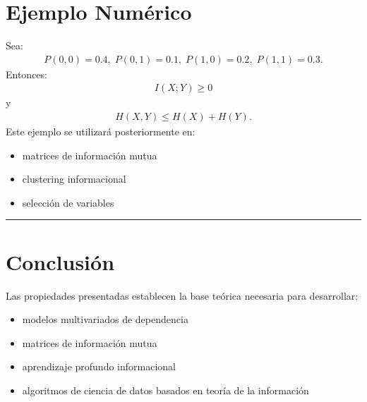 \documentclass[letterpaper,10pt,english]{jupyterBook}
\begin{document}
\section{Ejemplo Numérico}
\label{\detokenize{02_mathematical_foundations/properties_theorems:ejemplo-numerico}}
\sphinxAtStartPar
Sea:
\begin{equation*}
\begin{split}
P(0,0)=0.4,\;
P(0,1)=0.1,\;
P(1,0)=0.2,\;
P(1,1)=0.3.
\end{split}
\end{equation*}
\sphinxAtStartPar
Entonces:
\begin{equation*}
\begin{split}
I(X;Y)\ge 0
\end{split}
\end{equation*}
\sphinxAtStartPar
y
\begin{equation*}
\begin{split}
H(X,Y)\le H(X)+H(Y).
\end{split}
\end{equation*}
\sphinxAtStartPar
Este ejemplo se utilizará posteriormente en:
\begin{itemize}
\item {} 
\sphinxAtStartPar
matrices de información mutua

\item {} 
\sphinxAtStartPar
clustering informacional

\item {} 
\sphinxAtStartPar
selección de variables

\end{itemize}


\bigskip\hrule\bigskip



\section{Conclusión}
\label{\detokenize{02_mathematical_foundations/properties_theorems:conclusion}}
\sphinxAtStartPar
Las propiedades presentadas establecen la base teórica necesaria
para desarrollar:
\begin{itemize}
\item {} 
\sphinxAtStartPar
modelos multivariados de dependencia

\item {} 
\sphinxAtStartPar
matrices de información mutua

\item {} 
\sphinxAtStartPar
aprendizaje profundo informacional

\item {} 
\sphinxAtStartPar
algoritmos de ciencia de datos basados en teoría de la información

\end{itemize}
\end{document}
